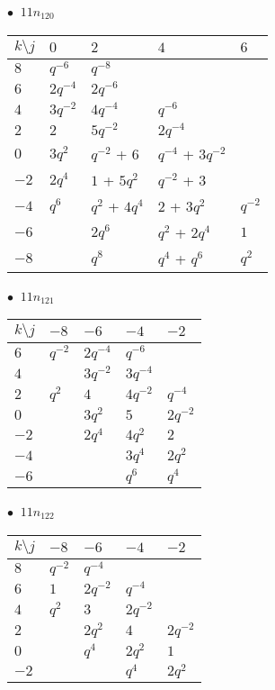 %
\begin{minipage}{\linewidth}
$\bullet\ $ $11n_{120}$ \vspace{0.5em} \\
\begin{tabular}{l|llll}
$k \setminus j$ & $0$ & $2$ & $4$ & $6$ \\
\hline
$8$ & $q^{-6}$ & $q^{-8}$ &  &  \\
$6$ & $2q^{-4}$ & $2q^{-6}$ &  &  \\
$4$ & $3q^{-2}$ & $4q^{-4}$ & $q^{-6}$ &  \\
$2$ & $2$ & $5q^{-2}$ & $2q^{-4}$ &  \\
$0$ & $3q^{2}$ & $q^{-2}$ + $6$ & $q^{-4}$ + $3q^{-2}$ &  \\
$-2$ & $2q^{4}$ & $1$ + $5q^{2}$ & $q^{-2}$ + $3$ &  \\
$-4$ & $q^{6}$ & $q^{2}$ + $4q^{4}$ & $2$ + $3q^{2}$ & $q^{-2}$ \\
$-6$ &  & $2q^{6}$ & $q^{2}$ + $2q^{4}$ & $1$ \\
$-8$ &  & $q^{8}$ & $q^{4}$ + $q^{6}$ & $q^{2}$ \\
\end{tabular}
\vspace{2em}
\end{minipage}
%
\begin{minipage}{\linewidth}
$\bullet\ $ $11n_{121}$ \vspace{0.5em} \\
\begin{tabular}{l|llll}
$k \setminus j$ & $-8$ & $-6$ & $-4$ & $-2$ \\
\hline
$6$ & $q^{-2}$ & $2q^{-4}$ & $q^{-6}$ &  \\
$4$ &  & $3q^{-2}$ & $3q^{-4}$ &  \\
$2$ & $q^{2}$ & $4$ & $4q^{-2}$ & $q^{-4}$ \\
$0$ &  & $3q^{2}$ & $5$ & $2q^{-2}$ \\
$-2$ &  & $2q^{4}$ & $4q^{2}$ & $2$ \\
$-4$ &  &  & $3q^{4}$ & $2q^{2}$ \\
$-6$ &  &  & $q^{6}$ & $q^{4}$ \\
\end{tabular}
\vspace{2em}
\end{minipage}
%
\begin{minipage}{\linewidth}
$\bullet\ $ $11n_{122}$ \vspace{0.5em} \\
\begin{tabular}{l|llll}
$k \setminus j$ & $-8$ & $-6$ & $-4$ & $-2$ \\
\hline
$8$ & $q^{-2}$ & $q^{-4}$ &  &  \\
$6$ & $1$ & $2q^{-2}$ & $q^{-4}$ &  \\
$4$ & $q^{2}$ & $3$ & $2q^{-2}$ &  \\
$2$ &  & $2q^{2}$ & $4$ & $2q^{-2}$ \\
$0$ &  & $q^{4}$ & $2q^{2}$ & $1$ \\
$-2$ &  &  & $q^{4}$ & $2q^{2}$ \\
\end{tabular}
\vspace{2em}
\end{minipage}
